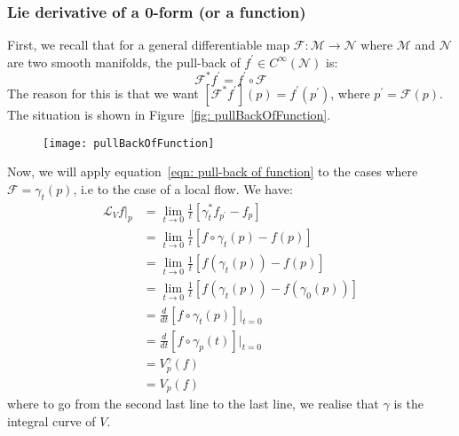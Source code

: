       \subsubsection{Lie derivative of a 0-form (or a function)}
        First, we recall that for a general differentiable map
        $\mathcal{F}:\mathcal{M} \rightarrow \mathcal{N}$ where $\mathcal{M}$
        and $\mathcal{N}$ are two smooth manifolds, the pull-back of
        $f^\prime \in C^\infty(\mathcal{N})$ is: 
        \begin{equation}
          \label{eqn: pull-back of function}
          \mathcal{F}^{*}f^\prime =
          f^\prime \circ \mathcal{F}
        \end{equation}
         The reason for this is that we want
        $\left[\mathcal{F}^{*}f^\prime\right](p) = f^\prime(p^\prime)$, where
        $p^\prime =
        \mathcal{F}(p)$. The situation is shown in Figure~\ref{fig:
        pullBackOfFunction}.
        \begin{figure}
          \centering
          \texttt{[image: pullBackOfFunction]}
          \caption[]{}
          \label{fig: pullBackOfFunction}
        \end{figure}
        Now, we will apply equation~\ref{eqn: pull-back of function} to the
        cases where $\mathcal{F} = \gamma_t(p)$, i.e to the case of a local
        flow. We have:
        \begin{align*}
          \mathcal{L}_V f\Bigr|_p &= \lim_{t\to 0}\frac{1}{t} \left[\gamma^*_t
          f_{p^\prime} - f_p\right] \\
          &= \lim_{t\to 0}\frac{1}{t} \left[f \circ \gamma_t(p) -
          f(p)\right] \\
          &= \lim_{t\to 0}\frac{1}{t} \left[f(\gamma_t(p)) -
          f(p)\right] \\ 
          &= \lim_{t\to 0}\frac{1}{t} \left[f(\gamma_t(p)) -
          f(\gamma_0(p))\right] \\ 
          &=\frac{d}{dt}\left[f \circ \gamma_t(p)\right]\Bigr|_{t=0} \\
          &=\frac{d}{dt}\left[f \circ \gamma_p(t)\right]\Bigr|_{t=0} \\
          &=V^\gamma_p(f) \\
          &=V_p(f)
        \end{align*}
        where to go from the second last line to the last line, we realise
        that $\gamma$ is the integral curve of $V$.

